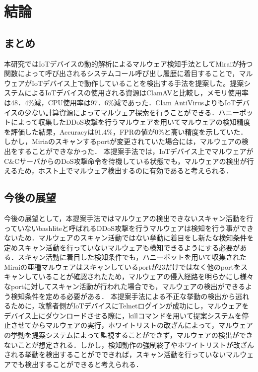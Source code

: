 \chapter{結論}

\section{まとめ}
本研究ではIoTデバイスの動的解析によるマルウェア検知手法としてMiraiが持つ関数によって呼び出されるシステムコール呼び出し履歴に着目することで，マルウェアがIoTデバイス上で動作していることを検出する手法を提案した。提案システムによるIoTデバイスの使用される資源はClamAVと比較し，メモリ使用率は48．4\%減，CPU使用率は97．6\%減であった．Clam AntiVirusよりもIoTデバイスの少ない計算資源によってマルウェア探索を行うことができる．ハニーポットによって収集したDDoS攻撃を行うマルウェアを用いてマルウェアの検知精度を評価した結果，Accuracyは91.4\%，FPRの値が0\%と高い精度を示していた．しかし，Miriaのスキャンするportが変更されていた場合には，マルウェアの検出をすることができなかった．
本提案手法では，IoTデバイス上でマルウェアがC\&CサーバからのDoS攻撃命令を待機している状態でも，マルウェアの検出が行えるため，ホスト上でマルウェア検出するのに有効であると考えられる．

\section{今後の展望}
今後の展望として，本提案手法ではマルウェアの検出できないスキャン活動を行っていないbashliteと呼ばれるDDoS攻撃を行うマルウェアは検知を行う事ができないため．マルウェアのスキャン活動ではない挙動に着目をし新たな検知条件を定めスキャン活動を行っていないマルウェアも検知できるようにする必要がある．スキャン活動に着目した検知条件でも，ハニーポットを用いて収集されたMiraiの亜種マルウェアはスキャンしているportが23だけではなく他のportをスキャンしていることが確認されたため，マルウェアの侵入経路を明らかにし様々なportに対してスキャン活動が行われた場合でも，マルウェアの検出ができるよう検知条件を定める必要がある．
本提案手法による不正な挙動の検出から逃れるために，攻撃者側がIoTデバイスにTelnetログインが成功にし，マルウェアをデバイス上にダウンロードさせる際に，killコマンドを用いて提案システムを停止させてからマルウェアの実行，ホワイトリストの改ざんによって，マルウェアの挙動を提案システムによって監視することができず，マルウェアの検出ができないことが想定される．しかし，検知動作の強制終了やホワイトリストが改ざんされる挙動を検出することがでできれば，スキャン活動を行っていないマルウェアでも検出することができると考えられる．
